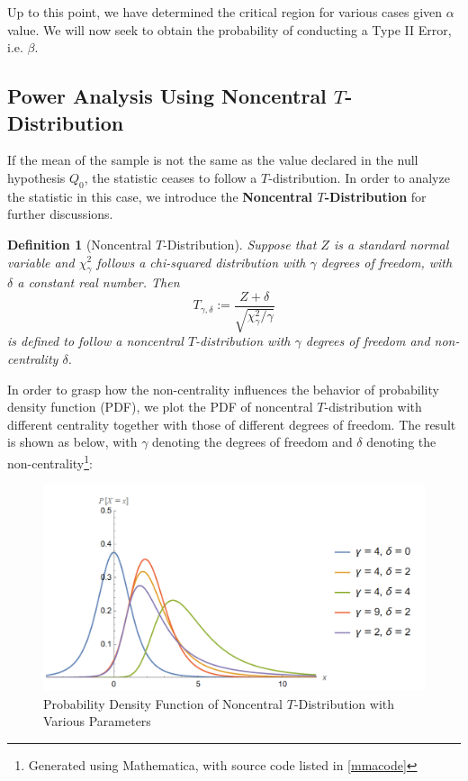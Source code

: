 \documentclass[12pt]{article}
\newtheorem{definition}{Definition}[section]
\begin{document}
Up to this point, we have determined the critical region for various cases given $\alpha$ value. We will now seek to obtain the probability of conducting a Type II Error, i.e. $\beta$.

\subsection{Power Analysis Using Noncentral $T$-Distribution}

If the mean of the sample is not the same as the value declared in the null hypothesis $Q_0$, the statistic ceases to follow a $T$-distribution. In order to analyze the statistic in this case, we introduce the \textbf{Noncentral $T$-Distribution} for further discussions. 

\begin{definition}[Noncentral $T$-Distribution]
    Suppose that $Z$ is a standard normal variable and $\chi_{\gamma}^2$ follows a chi-squared distribution with $\gamma$ degrees of freedom, with $\delta$ a constant real number. Then
    $$
    T_{\gamma, \delta} := \dfrac{Z + \delta}{\sqrt{\chi_{\gamma}^2/\gamma}}
    $$
    is defined to follow a noncentral $T$-distribution with $\gamma$ degrees of freedom and non-centrality $\delta$. 
\end{definition}

In order to grasp how the non-centrality influences the behavior of probability density function (PDF), we plot the PDF of noncentral $T$-distribution with different centrality together with those of different degrees of freedom. The result is shown as below, with $\gamma$ denoting the degrees of freedom and $\delta$ denoting the non-centrality\footnote{Generated using Mathematica, with source code listed in \ref{mmacode}}:

\begin{figure}[htbp]
    \centering
    \includegraphics[scale=0.65]{img/pdf_noncentral_t.png}
    \caption{Probability Density Function of Noncentral $T$-Distribution with Various Parameters}
\end{figure}
\end{document}
